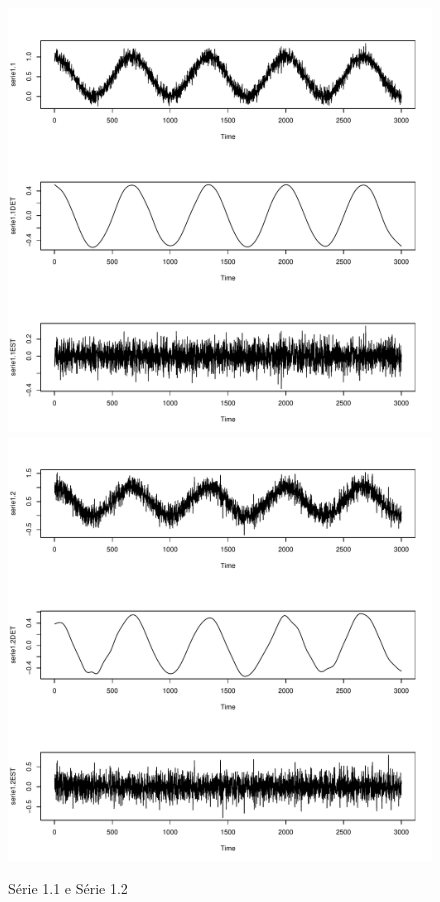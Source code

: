 \begin{figure}[H]
\begin{center}
  \includegraphics[scale=0.43]{serie1_1.pdf} \quad
  \includegraphics[scale=0.43]{serie1_2.pdf}
  \caption{Série 1.1 e Série 1.2}

\end{center}
\end{figure}

